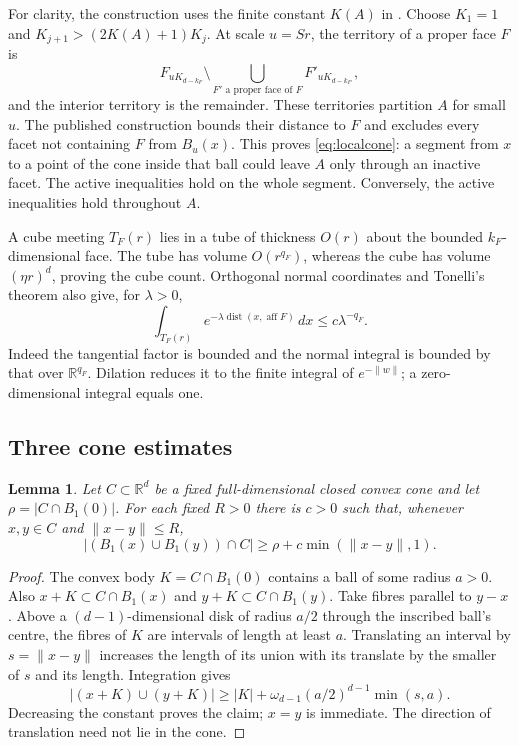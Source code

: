 \documentclass[11pt]{article}
\newtheorem{lemma}[theorem]{Lemma}
\theoremstyle{remark}
\newcommand{\R}{\mathbb R}
\newcommand{\dist}{\operatorname{dist}}
\newcommand{\aff}{\operatorname{aff}}
\begin{document}
For clarity, the construction uses the finite constant $K(A)$ in
\cite[Lemma~3.13]{PYH}. Choose $K_1=1$ and
$K_{j+1}>(2K(A)+1)K_j$. At scale $u=Sr$, the territory of a proper face $F$ is
\[
 F_{uK_{d-k_F}}\setminus
 \bigcup_{F'\text{ a proper face of }F}F'_{uK_{d-k_{F'}}},
\]
and the interior territory is the remainder. These territories partition
$A$ for small $u$. The published construction bounds their distance to $F$
and excludes every facet not containing $F$ from $B_u(x)$.
This proves \eqref{eq:localcone}: a segment from $x$ to a point of the cone
inside that ball could leave $A$ only through an inactive facet. The active
inequalities hold on the whole segment. Conversely, the active inequalities
hold throughout $A$.

A cube meeting $T_F(r)$ lies in a tube of thickness $O(r)$ about the bounded
$k_F$-dimensional face. The tube has volume $O(r^{q_F})$, whereas the cube has
volume $(\eta r)^d$, proving the cube count. Orthogonal normal coordinates and
Tonelli's theorem also give, for $\lambda>0$,
\begin{equation}\label{eq:depthintegral}
 \int_{T_F(r)}e^{-\lambda\dist(x,\aff F)}\,dx
 \leq c\lambda^{-q_F}.
\end{equation}
Indeed the tangential factor is bounded and the normal integral is bounded
by that over $\R^{q_F}$. Dilation reduces it to the finite integral of
$e^{-\|w\|}$; a zero-dimensional integral equals one.

\subsection{Three cone estimates}
\begin{lemma}\label{lem:translate}
Let $C\subset\R^d$ be a fixed full-dimensional closed convex cone and let
$\rho=|C\cap B_1(0)|$. For each fixed $R>0$ there is $c>0$ such that,
whenever $x,y\in C$ and $\|x-y\|\leq R$,
\[
 |(B_1(x)\cup B_1(y))\cap C|\geq\rho+c\min(\|x-y\|,1).
\]
\end{lemma}
\begin{proof}
The convex body $K=C\cap B_1(0)$ contains a ball of some radius $a>0$.
Also $x+K\subset C\cap B_1(x)$ and $y+K\subset C\cap B_1(y)$.
Take fibres parallel to $y-x$. Above a $(d-1)$-dimensional disk of radius
$a/2$ through the inscribed ball's centre, the fibres of $K$ are intervals of
length at least $a$. Translating an interval by $s=\|x-y\|$ increases the
length of its union with its translate by the smaller of $s$ and its length.
Integration gives
\[
 |(x+K)\cup(y+K)|\geq |K|+
 \omega_{d-1}(a/2)^{d-1}\min(s,a).
\]
Decreasing the constant proves the claim; $x=y$ is immediate. The direction
of translation need not lie in the cone.
\end{proof}
\end{document}

